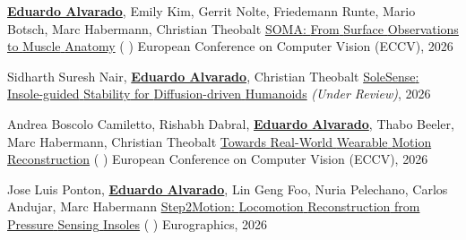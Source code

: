 
\begin{cventries}

\cvpublication
    {\textbf{\underline{Eduardo Alvarado}}, Emily Kim, Gerrit Nolte, Friedemann Runte, Mario Botsch, Marc Habermann, Christian Theobalt} %
    {\href{} {{SOMA}: {From} {Surface} {Observations} to {Muscle} {Anatomy}} (\href{https://github.com/edualvarado/SOMA}{} \href{https://arxiv.org/abs/2606.09246}{} \href{https://youtu.be/4EWyj6Ew9aw}{})} %
    {European Conference on Computer Vision (ECCV), 2026} %

\cvpublication
    {Sidharth Suresh Nair, \textbf{\underline{Eduardo Alvarado}}, Christian Theobalt} %
    {\href{} {{SoleSense}: {Insole-guided} {Stability} for {Diffusion-driven} {Humanoids}}} %
    {\textit{(Under Review)}, 2026} %

\cvpublication
    {Andrea Boscolo Camiletto, Rishabh Dabral, \textbf{\underline{Eduardo Alvarado}}, Thabo Beeler, Marc Habermann, Christian Theobalt} %
    {\href{} {{Towards} {Real-World} {Wearable} {Motion} {Reconstruction}} (\href{}{} \href{}{} \href{}{})} %
    {European Conference on Computer Vision (ECCV), 2026} %

\cvpublication
    {Jose Luis Ponton, \textbf{\underline{Eduardo Alvarado}}, Lin Geng Foo, Nuria Pelechano, Carlos Andujar, Marc Habermann} %
    {\href{https://vcai.mpi-inf.mpg.de/projects/Step2Motion/} {{Step2Motion}: {Locomotion} {Reconstruction} from {Pressure} {Sensing} {Insoles}} (\href{https://github.com/JLPM22/Step2Motion}{} \href{https://arxiv.org/abs/2510.22712}{} \href{https://vcai.mpi-inf.mpg.de/projects/Step2Motion/}{})} %
    {Eurographics, 2026} %


\end{cventries}
